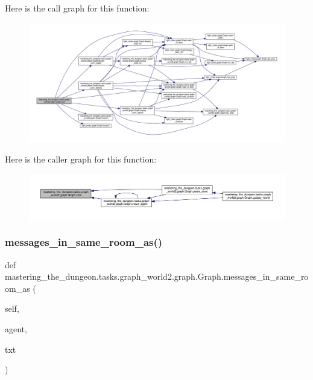 Here is the call graph for this function\+:
\nopagebreak
\begin{figure}[H]
\begin{center}
\leavevmode
\includegraphics[width=350pt]{classmastering__the__dungeon_1_1tasks_1_1graph__world2_1_1graph_1_1Graph_ad1d29bcd12397fa3b8813799f9b4f058_cgraph}
\end{center}
\end{figure}
Here is the caller graph for this function\+:
\nopagebreak
\begin{figure}[H]
\begin{center}
\leavevmode
\includegraphics[width=350pt]{classmastering__the__dungeon_1_1tasks_1_1graph__world2_1_1graph_1_1Graph_ad1d29bcd12397fa3b8813799f9b4f058_icgraph}
\end{center}
\end{figure}
\mbox{\label{classmastering__the__dungeon_1_1tasks_1_1graph__world2_1_1graph_1_1Graph_ab1f0ec6ea5faeb9dfcaa40b50d007649}} 
\subsubsection{\texorpdfstring{messages\+\_\+in\+\_\+same\+\_\+room\+\_\+as()}{messages\_in\_same\_room\_as()}}
{\footnotesize\ttfamily def mastering\+\_\+the\+\_\+dungeon.\+tasks.\+graph\+\_\+world2.\+graph.\+Graph.\+messages\+\_\+in\+\_\+same\+\_\+room\+\_\+as (\begin{DoxyParamCaption}\item[{}]{self,  }\item[{}]{agent,  }\item[{}]{txt }\end{DoxyParamCaption})}




